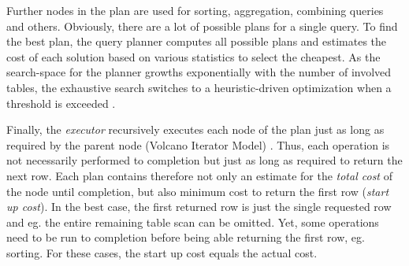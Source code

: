 Further nodes in the plan are used for sorting, aggregation, combining queries and others. Obviously, there are a lot of possible plans for a single query. To find the best plan, the query planner computes all possible plans and estimates the cost of each solution based on various statistics to select the cheapest. As the search-space for the planner growths exponentially with the number of involved tables, the exhaustive search switches to a heuristic-driven optimization when a threshold is exceeded \cite[p. 2064 ff.]{psql}.


Finally, the \textit{executor} recursively executes each node of the plan just as long as required by the parent node (Volcano Iterator Model) \cite{volcano}. Thus, each operation is not necessarily performed to completion but just as long as required to return the next row. Each plan contains therefore not only an estimate for the \textit{total cost} of the node until completion, but also minimum cost to return the first row (\textit{start up cost}). In the best case, the first returned row is just the single requested row and eg. the entire remaining table scan can be omitted. Yet, some operations need to be run to completion before being able returning the first row, eg. sorting. For these cases, the start up cost equals the actual cost.








